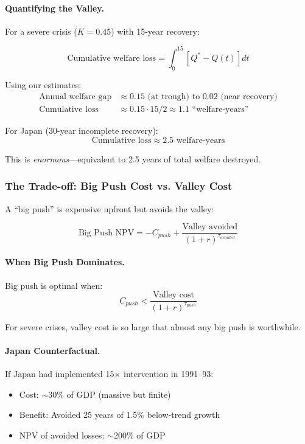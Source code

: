 \paragraph{Quantifying the Valley.}

For a severe crisis ($K = 0.45$) with 15-year recovery:

\begin{equation}
\text{Cumulative welfare loss} = \int_0^{15} [Q^* - Q(t)] dt
\end{equation}

Using our estimates:
\begin{align}
\text{Annual welfare gap} &\approx 0.15 \text{ (at trough)} \text{ to } 0.02 \text{ (near recovery)} \\
\text{Cumulative loss} &\approx 0.15 \cdot 15 / 2 \approx 1.1 \text{ ``welfare-years''}
\end{align}

For Japan (30-year incomplete recovery):
\begin{equation}
\text{Cumulative loss} \approx 2.5 \text{ welfare-years}
\end{equation}

This is \emph{enormous}---equivalent to 2.5 years of total welfare destroyed.

\subsubsection{The Trade-off: Big Push Cost vs. Valley Cost}

A ``big push'' is expensive upfront but avoids the valley:

\begin{equation}
\text{Big Push NPV} = -C_{push} + \frac{\text{Valley avoided}}{(1+r)^{\tau_{avoided}}}
\end{equation}

\paragraph{When Big Push Dominates.}
Big push is optimal when:
\begin{equation}
C_{push} < \frac{\text{Valley cost}}{(1+r)^{\tau_{push}}}
\end{equation}

For severe crises, valley cost is so large that almost any big push is worthwhile.

\paragraph{Japan Counterfactual.}
If Japan had implemented 15× intervention in 1991--93:
\begin{itemize}
    \item Cost: $\sim$30\% of GDP (massive but finite)
    \item Benefit: Avoided 25 years of 1.5\% below-trend growth
    \item NPV of avoided losses: $\sim$200\% of GDP
\end{itemize}

